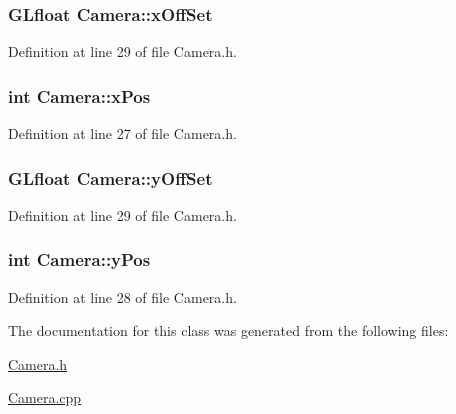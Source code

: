 \subsubsection[{x\+Off\+Set}]{\setlength{\rightskip}{0pt plus 5cm}G\+Lfloat Camera\+::x\+Off\+Set}\label{class_camera_a0c41085cad802bae1026706d23688034}


Definition at line 29 of file Camera.\+h.

\hypertarget{class_camera_a76f82934e9d29f80a6067b900d750b55}{}
\subsubsection[{x\+Pos}]{\setlength{\rightskip}{0pt plus 5cm}int Camera\+::x\+Pos}\label{class_camera_a76f82934e9d29f80a6067b900d750b55}


Definition at line 27 of file Camera.\+h.

\hypertarget{class_camera_a6d394f402515409bac177801ab11619b}{}
\subsubsection[{y\+Off\+Set}]{\setlength{\rightskip}{0pt plus 5cm}G\+Lfloat Camera\+::y\+Off\+Set}\label{class_camera_a6d394f402515409bac177801ab11619b}


Definition at line 29 of file Camera.\+h.

\hypertarget{class_camera_ae73c8dc0602e7849e7ec730f9acc1954}{}
\subsubsection[{y\+Pos}]{\setlength{\rightskip}{0pt plus 5cm}int Camera\+::y\+Pos}\label{class_camera_ae73c8dc0602e7849e7ec730f9acc1954}


Definition at line 28 of file Camera.\+h.



The documentation for this class was generated from the following files\+:\begin{DoxyCompactItemize}
\item 
\hyperlink{_camera_8h}{Camera.\+h}\item 
\hyperlink{_camera_8cpp}{Camera.\+cpp}\end{DoxyCompactItemize}
